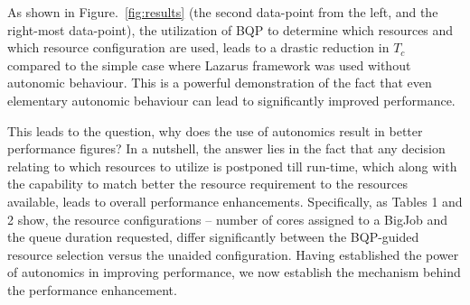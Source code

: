 \documentclass{sig-alternate}
\newcommand{\tc}{$T_c$ }
\newcommand{\up}{\vspace*{-0.3em}}
\begin{document}
As shown in Figure.~\ref{fig:results} (the second data-point from the left, and the right-most data-point), the utilization of BQP to determine which resources and which resource configuration are used, leads to a drastic reduction in \tc compared to the simple case where Lazarus framework was used without autonomic behaviour. This is a powerful demonstration of the fact that even elementary autonomic behaviour can lead to significantly improved performance.

\begin{table}
\caption{Table showing the configurations chosen
  on Ranger, with and without BQP. Notice how the use
  of BQP has a small, but significant change in the queue, size and duration
  requested.}\up\up\up\up\up\up\up
\end{table}

This leads to the question, why does the use of autonomics result in
better performance figures? In a nutshell, the answer lies in the fact
that any decision relating to which resources to utilize is postponed
till run-time, which along with the capability to match better the
resource requirement to the resources available, leads to overall
performance enhancements. Specifically, as Tables 1 and 2 show, the
resource configurations -- number of cores assigned to a BigJob and
the queue duration requested, differ significantly between the
BQP-guided resource selection versus the unaided configuration.
Having established the power of autonomics in improving performance,
we now establish the mechanism behind the performance enhancement.
\end{document}
